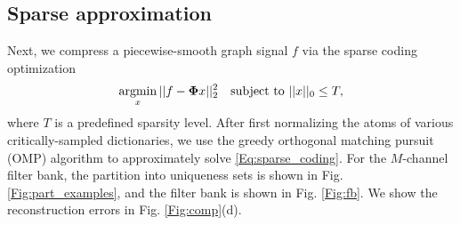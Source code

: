 \documentclass[journal, 10pt]{IEEEtran}
\begin{document}
\subsection{Sparse approximation}
Next, we compress 
a piecewise-smooth graph signal $f$ via the sparse coding optimization
\begin{align}\label{Eq:sparse_coding}
\argmin_x   || f-\boldsymbol{\Phi}x ||_2^2 \hbox{~~~subject to } ||x||_0 \leq T,
\end{align}
where $T$ is a predefined sparsity level. After first normalizing the atoms of various critically-sampled dictionaries, we use the greedy %
 orthogonal matching pursuit (OMP) algorithm \cite{tropp2004greed,elad_book} to approximately solve \eqref{Eq:sparse_coding}. For the $M$-channel filter bank, the partition into uniqueness sets is shown in Fig. \ref{Fig:part_examples}, and the filter bank is shown in Fig. \ref{Fig:fb}. We show the reconstruction errors in Fig. \ref{Fig:comp}(d). 
\end{document}
